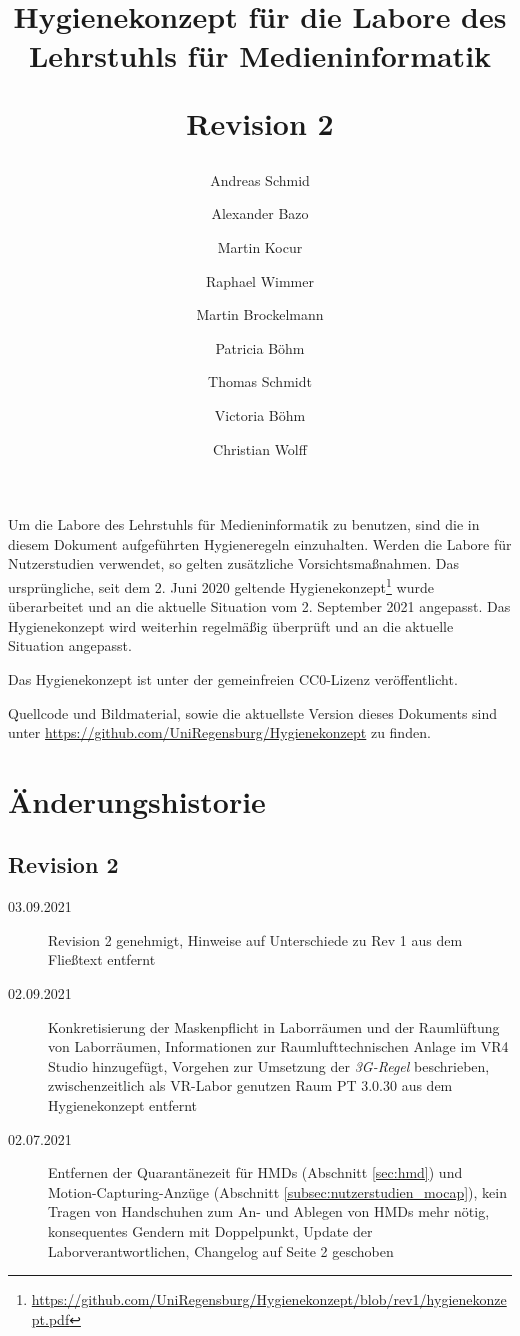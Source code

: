 \documentclass[hidelinks,12pt]{extarticle}
\title{
    \bfseries
    \sffamily
    Hygienekonzept für die Labore des Lehrstuhls für Medieninformatik

    \medskip
    \large{Revision 2}
}
\author{Andreas Schmid}
\author{Alexander Bazo}
\author{Martin Kocur}
\author{Raphael Wimmer}
\author{Martin Brockelmann}
\author{Patricia Böhm}
\author{Thomas Schmidt}
\author{Victoria Böhm}
\author{Christian Wolff}
\affil{Lehrstuhl für Medieninformatik, Universität Regensburg}
\begin{document}
\onehalfspacing
\maketitle

\noindent
Um die Labore des Lehrstuhls für Medieninformatik zu benutzen, sind die in diesem Dokument aufgeführten Hygieneregeln einzuhalten.
Werden die Labore für Nutzerstudien verwendet, so gelten zusätzliche Vorsichtsmaßnahmen.
Das ursprüngliche, seit dem 2. Juni 2020 geltende Hygienekonzept\footnote{\url{https://github.com/UniRegensburg/Hygienekonzept/blob/rev1/hygienekonzept.pdf}} wurde überarbeitet und an die aktuelle Situation vom 2. September 2021 angepasst.
Das Hygienekonzept wird weiterhin regelmäßig überprüft und an die aktuelle Situation angepasst.

\medskip
\noindent
Das Hygienekonzept ist unter der gemeinfreien CC0-Lizenz veröffentlicht.

\noindent
Quellcode und Bildmaterial, sowie die aktuellste Version dieses Dokuments sind unter \url{https://github.com/UniRegensburg/Hygienekonzept} zu finden.

\newpage

\section*{Änderungshistorie}\label{app:changelog}

\subsection*{Revision 2}

\begin{description}
    \item[03.09.2021] Revision 2 genehmigt, Hinweise auf Unterschiede zu Rev 1 aus dem Fließtext entfernt
    \item[02.09.2021] Konkretisierung der Maskenpflicht in Laborräumen und der Raumlüftung von Laborräumen, Informationen zur Raumlufttechnischen Anlage im VR4 Studio hinzugefügt, Vorgehen zur Umsetzung der \emph{3G-Regel} beschrieben, zwischenzeitlich als VR-Labor genutzen Raum PT 3.0.30 aus dem Hygienekonzept entfernt
    \item[02.07.2021] Entfernen der Quarantänezeit für HMDs (Abschnitt \ref{sec:hmd}) und Motion-Capturing-Anzüge (Abschnitt \ref{subsec:nutzerstudien_mocap}), kein Tragen von Handschuhen zum An- und Ablegen von HMDs mehr nötig, konsequentes Gendern mit Doppelpunkt, Update der Laborverantwortlichen, Changelog auf Seite 2 geschoben
\end{description}
\end{document}
